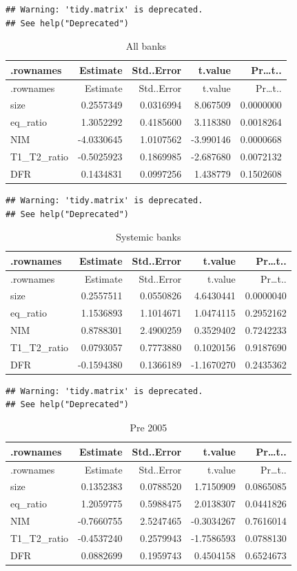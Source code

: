 \documentclass[11pt,]{article}
\begin{document}
\begin{verbatim}
## Warning: 'tidy.matrix' is deprecated.
## See help("Deprecated")
\end{verbatim}

\begin{longtable}[]{@{}lrrrr@{}}
\caption{All banks}\tabularnewline
\toprule
.rownames & Estimate & Std..Error & t.value &
Pr\ldots{}t..\tabularnewline
\midrule
\endfirsthead
\toprule
.rownames & Estimate & Std..Error & t.value &
Pr\ldots{}t..\tabularnewline
\midrule
\endhead
size & 0.2557349 & 0.0316994 & 8.067509 & 0.0000000\tabularnewline
eq\_ratio & 1.3052292 & 0.4185600 & 3.118380 & 0.0018264\tabularnewline
NIM & -4.0330645 & 1.0107562 & -3.990146 & 0.0000668\tabularnewline
T1\_T2\_ratio & -0.5025923 & 0.1869985 & -2.687680 &
0.0072132\tabularnewline
DFR & 0.1434831 & 0.0997256 & 1.438779 & 0.1502608\tabularnewline
\bottomrule
\end{longtable}

\begin{verbatim}
## Warning: 'tidy.matrix' is deprecated.
## See help("Deprecated")
\end{verbatim}

\begin{longtable}[]{@{}lrrrr@{}}
\caption{Systemic banks}\tabularnewline
\toprule
.rownames & Estimate & Std..Error & t.value &
Pr\ldots{}t..\tabularnewline
\midrule
\endfirsthead
\toprule
.rownames & Estimate & Std..Error & t.value &
Pr\ldots{}t..\tabularnewline
\midrule
\endhead
size & 0.2557511 & 0.0550826 & 4.6430441 & 0.0000040\tabularnewline
eq\_ratio & 1.1536893 & 1.1014671 & 1.0474115 & 0.2952162\tabularnewline
NIM & 0.8788301 & 2.4900259 & 0.3529402 & 0.7242233\tabularnewline
T1\_T2\_ratio & 0.0793057 & 0.7773880 & 0.1020156 &
0.9187690\tabularnewline
DFR & -0.1594380 & 0.1366189 & -1.1670270 & 0.2435362\tabularnewline
\bottomrule
\end{longtable}

\begin{verbatim}
## Warning: 'tidy.matrix' is deprecated.
## See help("Deprecated")
\end{verbatim}

\begin{longtable}[]{@{}lrrrr@{}}
\caption{Pre 2005}\tabularnewline
\toprule
.rownames & Estimate & Std..Error & t.value &
Pr\ldots{}t..\tabularnewline
\midrule
\endfirsthead
\toprule
.rownames & Estimate & Std..Error & t.value &
Pr\ldots{}t..\tabularnewline
\midrule
\endhead
size & 0.1352383 & 0.0788520 & 1.7150909 & 0.0865085\tabularnewline
eq\_ratio & 1.2059775 & 0.5988475 & 2.0138307 & 0.0441826\tabularnewline
NIM & -0.7660755 & 2.5247465 & -0.3034267 & 0.7616014\tabularnewline
T1\_T2\_ratio & -0.4537240 & 0.2579943 & -1.7586593 &
0.0788130\tabularnewline
DFR & 0.0882699 & 0.1959743 & 0.4504158 & 0.6524673\tabularnewline
\bottomrule
\end{longtable}
\end{document}
